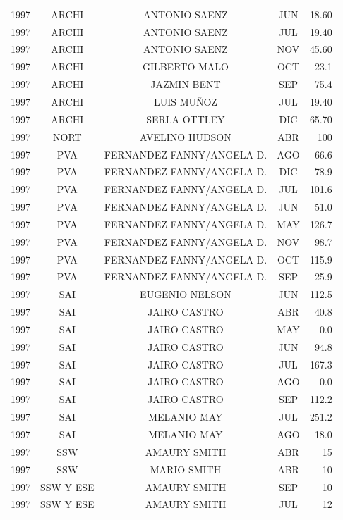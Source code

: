 \documentclass[12pt,]{article}
\begin{document}
\begin{table}[ht]
{\begin{tabular}{lcccr}
  1997 & ARCHI & ANTONIO SAENZ & JUN & 18.60 \\ 
  1997 & ARCHI & ANTONIO SAENZ & JUL & 19.40 \\ 
  1997 & ARCHI & ANTONIO SAENZ & NOV & 45.60 \\ 
  1997 & ARCHI & GILBERTO MALO & OCT & 23.1 \\ 
  1997 & ARCHI & JAZMIN BENT & SEP & 75.4 \\ 
  1997 & ARCHI & LUIS MUÑOZ & JUL & 19.40 \\ 
  1997 & ARCHI & SERLA OTTLEY & DIC & 65.70 \\ 
  1997 & NORT & AVELINO  HUDSON & ABR & 100 \\ 
  1997 & PVA & FERNANDEZ FANNY/ANGELA D. & AGO & 66.6 \\ 
  1997 & PVA & FERNANDEZ FANNY/ANGELA D. & DIC & 78.9 \\ 
  1997 & PVA & FERNANDEZ FANNY/ANGELA D. & JUL & 101.6 \\ 
  1997 & PVA & FERNANDEZ FANNY/ANGELA D. & JUN & 51.0 \\ 
  1997 & PVA & FERNANDEZ FANNY/ANGELA D. & MAY & 126.7 \\ 
  1997 & PVA & FERNANDEZ FANNY/ANGELA D. & NOV & 98.7 \\ 
  1997 & PVA & FERNANDEZ FANNY/ANGELA D. & OCT & 115.9 \\ 
  1997 & PVA & FERNANDEZ FANNY/ANGELA D. & SEP & 25.9 \\ 
  1997 & SAI & EUGENIO NELSON & JUN & 112.5 \\ 
  1997 & SAI & JAIRO CASTRO & ABR & 40.8 \\ 
  1997 & SAI & JAIRO CASTRO & MAY & 0.0 \\ 
  1997 & SAI & JAIRO CASTRO & JUN & 94.8 \\ 
  1997 & SAI & JAIRO CASTRO & JUL & 167.3 \\ 
  1997 & SAI & JAIRO CASTRO & AGO & 0.0 \\ 
  1997 & SAI & JAIRO CASTRO & SEP & 112.2 \\ 
  1997 & SAI & MELANIO MAY & JUL & 251.2 \\ 
  1997 & SAI & MELANIO MAY & AGO & 18.0 \\ 
  1997 & SSW & AMAURY SMITH & ABR & 15 \\ 
  1997 & SSW & MARIO SMITH & ABR & 10 \\ 
  1997 & SSW Y ESE & AMAURY SMITH & SEP & 10 \\ 
  1997 & SSW Y ESE & AMAURY SMITH & JUL & 12 \\ 

\end{tabular}}
\end{table}
\end{document}
